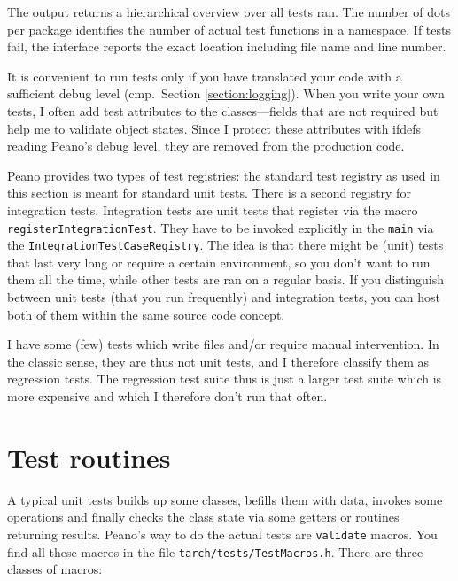 \noindent
The output returns a hierarchical overview over all tests ran. 
The number of dots per package identifies the number of actual test functions in
a namespace.
If tests fail, the interface reports the exact location including file name and
line number.


\begin{remark}
  It is convenient to run tests only if you have translated your code with a 
  sufficient debug level (cmp.~Section \ref{section:logging}).
  When you write your own tests, I often add test attributes to the
  classes---fields that are not required but help me to validate object
  states. Since I protect these attributes with ifdefs reading Peano's debug
  level, they are removed from the production code.
\end{remark}



  Peano provides two types of test registries: the standard test registry as
  used in this section is meant for standard unit tests. There is a second
  registry for integration tests. Integration tests are unit tests that register
  via the macro \texttt{registerIntegrationTest}. They have to be invoked
  explicitly in the \texttt{main} via the \texttt{IntegrationTestCaseRegistry}. 
  The idea is that there might be (unit) tests that last very long or require a
  certain environment, so you don't want to run them all the time, while other
  tests are ran on a regular basis. If you distinguish between unit tests (that
  you run frequently) and integration tests, you can host both of them within
  the same source code concept. 


\begin{remark}
 I have some (few) tests which write files and/or require manual intervention.
 In the classic sense, they are thus not unit tests, and I therefore classify
 them as regression tests.
 The regression test suite thus is just a larger test suite which is more
 expensive and which I therefore don't run that often.
\end{remark}


\section{Test routines}

A typical unit tests builds up some classes, befills them with data, invokes
some operations and finally checks the class state via some getters or routines
returning results.
Peano's way to do the actual tests are \texttt{validate} macros.
You find all these macros in the file \texttt{tarch/tests/TestMacros.h}.
There are three classes of macros:

